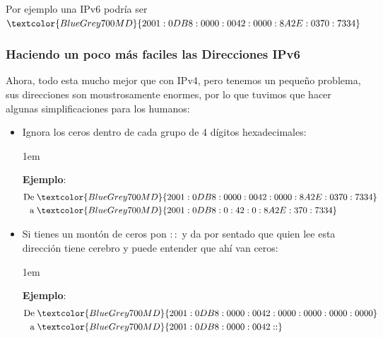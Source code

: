 \documentclass[12pt, fleqn]{report}                             %
\newenvironment{SmallIndentation}[1][0.75em]                    %
        {\begin{adjustwidth}{#1}{}\begin{footnotesize}}             %
        {\end{footnotesize}\end{adjustwidth}}                       %
\theoremstyle{break}                                            %
\newcommand{\Color}[2]{\textcolor{#1}{#2}}                      %
\begin{document}
                Por ejemplo una IPv6 podría ser $\Color{BlueGrey700MD}{2001:0DB8:0000:0042:0000:8A2E:0370:7334}$


                \vspace{0.5em}
                \subsubsection{Haciendo un poco más faciles las Direcciones IPv6}

                Ahora, todo esta mucho mejor que con IPv4, pero tenemos un pequeño
                problema, sus direcciones son moustrosamente enormes, por lo que tuvimos
                que hacer algunas simplificaciones para los humanos:

                \begin{itemize}
                    \item
                        Ignora los ceros dentro de cada grupo de 4 dígitos hexadecimales:

                        \begin{SmallIndentation}[1em]
                            \textbf{Ejemplo}:
                            \begin{align*}
                                \text{De} \; &\Color{BlueGrey700MD}{2001:0DB8:0000:0042:0000:8A2E:0370:7334}  \\
                                \text{a}  \; &\Color{BlueGrey700MD}{2001:0DB8:0:42:0:8A2E:370:7334} 
                            \end{align*}
                        
                        \end{SmallIndentation}
                        
                    \item 
                        Si tienes un montón de ceros pon $::$ y da por sentado que quien lee esta dirección
                        tiene cerebro y puede entender que ahí van ceros:

                        \begin{SmallIndentation}[1em]
                            \textbf{Ejemplo}:
                            \begin{align*}
                                \text{De} \; &\Color{BlueGrey700MD}{2001:0DB8:0000:0042:0000:0000:0000:0000}   \\
                                \text{a}  \; &\Color{BlueGrey700MD}{2001:0DB8:0000:0042::}         
                            \end{align*}
                        
                        \end{SmallIndentation}

                \end{itemize}
\end{document}
